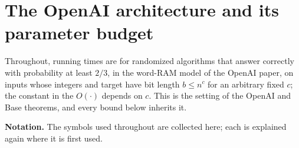 \documentclass[11pt]{article}
\theoremstyle{plain}
\begin{document}
\section{The OpenAI architecture and its parameter budget}

Throughout, running times are for randomized algorithms that answer correctly with probability at least $2/3$, in the word-RAM model of the OpenAI paper, on inputs whose integers and target have bit length $b \le n^c$ for an arbitrary fixed $c$; the constant in the $O(\cdot)$ depends on $c$. This is the setting of the OpenAI and Base theorems, and every bound below inherits it.

\textbf{Notation.} The symbols used throughout are collected here; each is explained again where it is first used.
\end{document}
